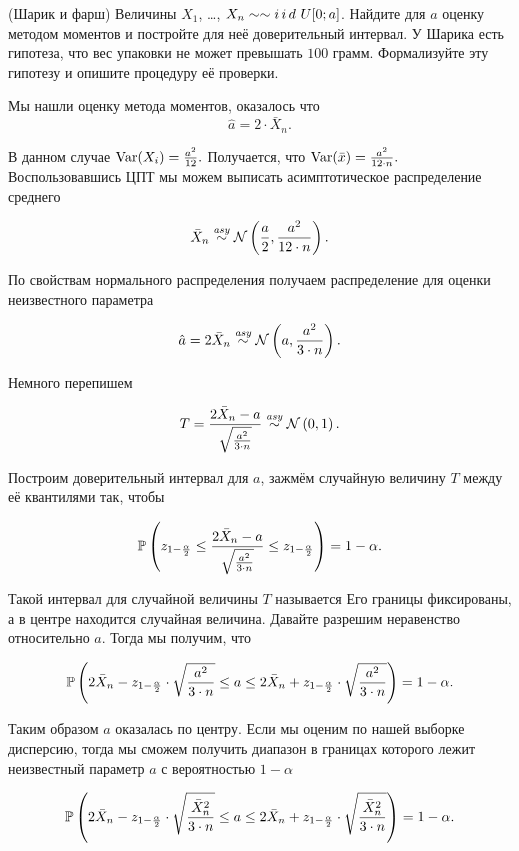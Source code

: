 \documentclass[12pt, a4paper, oneside]{article}
\begin{document}
\begin{problem}{(Шарик и фарш)}
Величины $X_1$, \ldots, $X_n \sim \sim i\,i\,d\,\, U[0;a]$. Найдите для $a$ оценку методом моментов и постройте для неё доверительный интервал. У Шарика есть гипотеза, что вес упаковки не может превышать $100$ грамм. Формализуйте эту гипотезу и опишите процедуру её проверки. 
\end{problem}

\begin{sol}
Мы нашли оценку метода моментов, оказалось что 
\[ \hat{a} = 2 \cdot \bar{X}_{n}. \]

В данном случае $\operatorname{Var}(X_i) = \frac{a^2}{12}.$ Получается, что $\operatorname{Var}(\bar x) = \frac{a^2}{12 \cdot n}.$ Воспользовавшись ЦПТ мы можем выписать асимптотическое распределение среднего 

\[\bar{X}_n \overset{\text{\textit{asy}}}{\sim} \mathcal{N} \left(\frac{a}{2}, \frac{a^2}{12 \cdot n} \right).\] 

По свойствам нормального распределения получаем распределение для оценки неизвестного параметра

\[\hat{a}= 2 \bar{X}_{n} \overset{\text{\textit{asy}}}{\sim} \mathcal{N} \left(a, \frac{a^2}{3 \cdot n} \right).\] 

Немного перепишем 

\[ T = \frac{ 2 \bar{X}_{n} - a}{\sqrt{\frac{a^2}{3 \cdot n}} } \overset{\text{\textit{asy}}}{\sim} \mathcal{N} \left(0, 1 \right).\] 

Построим доверительный интервал для $a$, зажмём случайную величину $T$ между её квантилями так, чтобы 

$$
\mathbb{P} \left( z_{1 - \frac{\alpha}{2}} \le \frac{ 2 \bar{X}_{n} - a}{\sqrt{\frac{a^2}{3 \cdot n}} } \le z_{1 - \frac{\alpha}{2}} \right) = 1 - \alpha.
$$

Такой интервал для случайной величины $T$ называется  Его границы фиксированы, а в центре находится случайная величина. Давайте разрешим неравенство относительно $a$. Тогда мы получим, что

$$
\mathbb{P}\left(2 \bar{X}_{n}  - z_{1 - \frac{\alpha}{2}} \cdot \sqrt{\frac{a^2}{3 \cdot n}}  \le a \le 2 \bar{X}_{n}  + z_{1 - \frac{\alpha}{2}} \cdot \sqrt{\frac{a^2}{3 \cdot n}} \right) = 1 - \alpha.
$$

Таким образом $a$ оказалась по центру. Если мы оценим по нашей выборке дисперсию, тогда мы сможем получить диапазон в границах которого лежит неизвестный параметр $a$ с вероятностью $1 - \alpha$

$$
\mathbb{P}\left(2 \bar{X}_{n}  - z_{1 - \frac{\alpha}{2}} \cdot \sqrt{\frac{\bar{X}_{n}^2}{3 \cdot n}}  \le a \le 2 \bar{X}_{n}  + z_{1 - \frac{\alpha}{2}} \cdot \sqrt{\frac{\bar{X}_{n}^2}{3 \cdot n}} \right) = 1 - \alpha.
$$


\end{sol}
\end{document}
